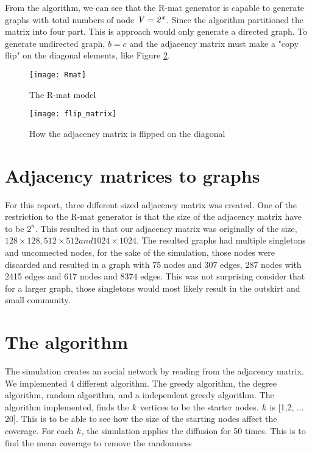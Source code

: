 From the algorithm, we can see that the R-mat generator is capable to generate graphs with total numbers of node $ \it{V} = 2^x$. Since the algorithm partitioned the matrix into four part. This is approach would only generate a directed graph. To generate undirected graph, $b = c$ and the adjacency matrix must make a "copy flip" on the diagonal elements, like Figure \ref{fig:flipDiagonal}. 

\begin{figure}
\texttt{[image: Rmat]}
\caption{The R-mat model}
\label{fig:Rmat}
\end{figure}

\begin{figure}
\texttt{[image: flip\_matrix]}
\caption{How the adjacency matrix is flipped on the diagonal}
\label{fig:flipDiagonal}

\end{figure}


\section{Adjacency matrices to graphs}
For this report, three different sized adjacency matrix was created. One of the restriction to the R-mat generator is that the size of the adjacency matrix have to be $2^n$. This resulted in that our adjacency matrix was originally of the size, $128 \times 128, 512 \times 512 and 1024 \times 1024$. The resulted graphs had multiple singletons and unconnected nodes, for the sake of the simulation, those nodes were discarded and resulted in a graph with 75 nodes and 307 edges, 287 nodes with 2415 edges and 617 nodes and 8374 edges. This was not surprising consider that for a larger graph, those singletons would most likely result in the outskirt and small community.

\section{The algorithm}
The simulation creates an social network by reading from the adjacency matrix. We implemented 4 different algorithm. The greedy algorithm, the degree algorithm, random algorithm, and a independent greedy algorithm. The algorithm implemented, finds the $\it{k}$ vertices to be the starter nodes. $\it{k}$ is [1,2,  $\dots$ 20]. This is to be able to see how the size of the starting nodes affect the coverage. For each $\it{k}$, the simulation applies the diffusion for 50 times. This is to find the mean coverage to remove the randomness 

